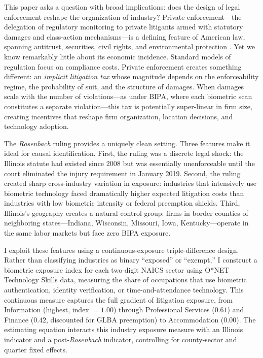 \documentclass[12pt]{article}
\begin{document}
This paper asks a question with broad implications: does the design of legal enforcement reshape the organization of industry? Private enforcement---the delegation of regulatory monitoring to private litigants armed with statutory damages and class-action mechanisms---is a defining feature of American law, spanning antitrust, securities, civil rights, and environmental protection \citep{shavell1984}. Yet we know remarkably little about its economic incidence. Standard models of regulation focus on compliance costs. Private enforcement creates something different: an \textit{implicit litigation tax} whose magnitude depends on the enforceability regime, the probability of suit, and the structure of damages. When damages scale with the number of violations---as under BIPA, where each biometric scan constitutes a separate violation---this tax is potentially super-linear in firm size, creating incentives that reshape firm organization, location decisions, and technology adoption.

The \textit{Rosenbach} ruling provides a uniquely clean setting. Three features make it ideal for causal identification. First, the ruling was a discrete legal shock: the Illinois statute had existed since 2008 but was essentially unenforceable until the court eliminated the injury requirement in January 2019. Second, the ruling created sharp cross-industry variation in exposure: industries that intensively use biometric technology faced dramatically higher expected litigation costs than industries with low biometric intensity or federal preemption shields. Third, Illinois's geography creates a natural control group: firms in border counties of neighboring states---Indiana, Wisconsin, Missouri, Iowa, Kentucky---operate in the same labor markets but face zero BIPA exposure.

I exploit these features using a continuous-exposure triple-difference design. Rather than classifying industries as binary ``exposed'' or ``exempt,'' I construct a biometric exposure index for each two-digit NAICS sector using O*NET Technology Skills data, measuring the share of occupations that use biometric authentication, identity verification, or time-and-attendance technology. This continuous measure captures the full gradient of litigation exposure, from Information (highest, index $= 1.00$) through Professional Services ($0.61$) and Finance ($0.42$, discounted for GLBA preemption) to Accommodation ($0.00$). The estimating equation interacts this industry exposure measure with an Illinois indicator and a post-\textit{Rosenbach} indicator, controlling for county-sector and quarter fixed effects.
\end{document}

